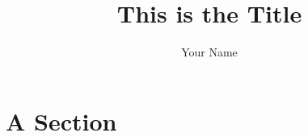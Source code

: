 \documentclass{article}
\title{This is the Title}
\author{Your Name}
\begin{document}
\maketitle


%   

\section{A Section}




\end{document}
